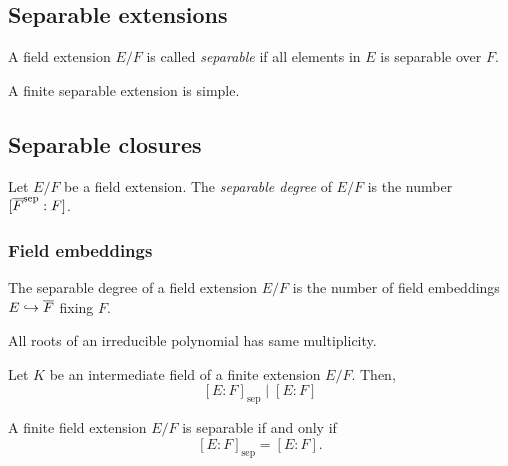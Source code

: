 \documentclass{../exp}
\newcommand{\sep}{\mathrm{sep}}
\begin{document}
\subsection{Separable extensions}
\begin{defn}
A field extension $E/F$ is called \emph{separable} if all elements in $E$ is separable over $F$.
\end{defn}

\begin{thm}
A finite separable extension is simple.
\end{thm}





\subsection{Separable closures}



\begin{defn}
Let $E/F$ be a field extension.
The \emph{separable degree} of $E/F$ is the number $[\cl F^{\sep}:F]$.
\end{defn}



\subsubsection{Field embeddings}

\begin{thm}
The separable degree of a field extension $E/F$ is the number of field embeddings $E\hookrightarrow\overline F$ fixing $F$.
\end{thm}

\begin{lem}
All roots of an irreducible polynomial has same multiplicity.
\end{lem}
\begin{pf}
\end{pf}

\begin{thm}
Let $K$ be an intermediate field of a finite extension $E/F$.
Then,
\[[E:F]_\sep\mid[E:F]\]
\end{thm}
\begin{pf}
\end{pf}

\begin{thm}
A finite field extension $E/F$ is separable if and only if
\[[E:F]_\sep=[E:F].\]
\end{thm}
\begin{pf}
\end{pf}
\end{document}
